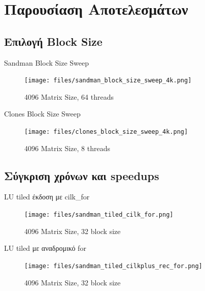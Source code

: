 \documentclass{beamer}
\begin{document}
\section{Παρουσίαση Αποτελεσμάτων}

\subsection{Επιλογή Block Size}
    \begin{frame}
        \begin{block}{Sandman Block Size Sweep}
            \begin{figure}[H]
                \centering
                \texttt{[image: files/sandman\_block\_size\_sweep\_4k.png]}
                \caption{4096 Matrix Size, 64 threads}
            \end{figure}
        \end{block}
    \end{frame}

    \begin{frame}
        \begin{block}{Clones Block Size Sweep}
            \begin{figure}[H]
                \centering
                \texttt{[image: files/clones\_block\_size\_sweep\_4k.png]}
                \caption{4096 Matrix Size, 8 threads}
            \end{figure}
        \end{block}
    \end{frame}

\subsection{Σύγκριση χρόνων και speedups}

\begin{frame}
    \begin{block}{LU tiled έκδοση με cilk\_for}
        \begin{figure}[H]
            \centering
            \texttt{[image: files/sandman\_tiled\_cilk\_for.png]}
            \caption{4096 Matrix Size, 32 block size}
        \end{figure}
    \end{block}
\end{frame}

\begin{frame}
    \begin{block}{LU tiled με αναδρομικό for}
        \begin{figure}[H]
            \centering
            \texttt{[image: files/sandman\_tiled\_cilkplus\_rec\_for.png]}
            \caption{4096 Matrix Size, 32 block size}
        \end{figure}
    \end{block}
\end{frame}
\end{document}
